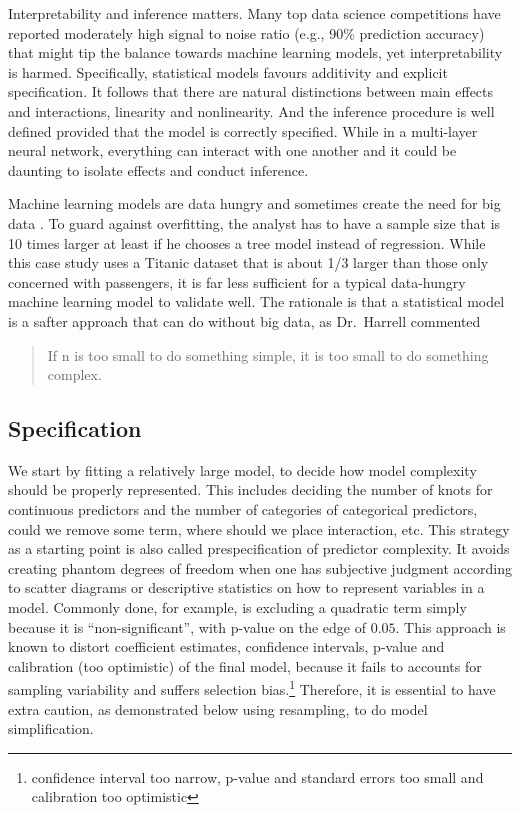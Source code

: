 \documentclass[]{interact}
\theoremstyle{plain}%
\theoremstyle{definition}
\theoremstyle{remark}
\begin{document}
Interpretability and inference matters. Many top data science competitions have reported moderately high signal to noise ratio (e.g., 90\% prediction accuracy) that might tip the balance towards machine learning models, yet interpretability is harmed. Specifically, statistical models favours additivity and explicit specification. It follows that there are natural distinctions between main effects and interactions, linearity and nonlinearity. And the inference procedure is well defined provided that the model is correctly specified. While in a multi-layer neural network, everything can interact with one another and it could be daunting to isolate effects and conduct inference.

Machine learning models are data hungry and sometimes create the need for big data \citep{van2014modern}. To guard against overfitting, the analyst has to have a sample size that is 10 times larger at least if he chooses a tree model instead of regression. While this case study uses a Titanic dataset that is about 1/3 larger than those only concerned with passengers, it is far less sufficient for a typical data-hungry machine learning model to validate well. The rationale is that a statistical model is a safter approach that can do without big data, as Dr.~Harrell commented

\begin{quote}
If n is too small to do something simple, it is too small to do something complex.
\end{quote}

\hypertarget{spec}{%
\subsection{Specification}\label{spec}}

We start by fitting a relatively large model, to decide how model complexity should be properly represented. This includes deciding the number of knots for continuous predictors and the number of categories of categorical predictors, could we remove some term, where should we place interaction, etc. This strategy as a starting point is also called prespecification of predictor complexity. It avoids creating phantom degrees of freedom when one has subjective judgment according to scatter diagrams or descriptive statistics on how to represent variables in a model. Commonly done, for example, is excluding a quadratic term simply because it is ``non-significant'', with p-value on the edge of \(0.05\). This approach is known to distort coefficient estimates, confidence intervals, p-value and calibration (too optimistic) of the final model, because it fails to accounts for sampling variability and suffers selection bias.\citep{grambsch1991effects}\footnote{confidence interval too narrow, p-value and standard errors too small and calibration too optimistic} Therefore, it is essential to have extra caution, as demonstrated below using resampling, to do model simplification.
\end{document}
